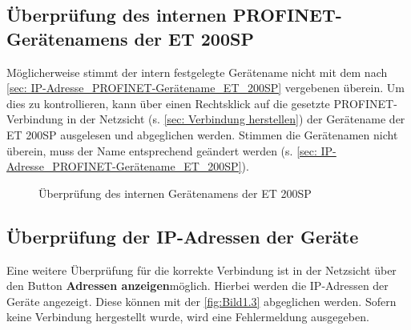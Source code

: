 \subsection{Überprüfung des internen PROFINET-Gerätenamens der ET 200SP}
Möglicherweise stimmt der intern festgelegte Gerätename nicht mit dem nach \autoref{sec: IP-Adresse_PROFINET-Gerätename_ET_200SP} vergebenen überein. Um dies zu kontrollieren, kann über einen Rechtsklick auf die gesetzte PROFINET-Verbindung in der Netzsicht (s. \autoref{sec: Verbindung herstellen}) der Gerätename der ET 200SP ausgelesen und abgeglichen werden. Stimmen die Gerätenamen nicht überein, muss der Name entsprechend geändert werden (s. \autoref{sec: IP-Adresse_PROFINET-Gerätename_ET_200SP}).

\begin{figure}[H]
   \centering
   \caption[Überprüfung des internen Gerätenamens der ET 200SP]{Überprüfung des internen Gerätenamens der ET 200SP}
   \label{fig:Bild5.3}
\end{figure}

\subsection{Überprüfung der IP-Adressen der Geräte}
Eine weitere Überprüfung für die korrekte Verbindung ist in der Netzsicht über den Button \glqq\textbf{Adressen anzeigen}\grqq\:möglich. Hierbei werden die IP-Adressen der Geräte angezeigt. Diese können mit der \autoref{fig:Bild1.3} abgeglichen werden. Sofern keine Verbindung hergestellt wurde, wird eine Fehlermeldung ausgegeben.

